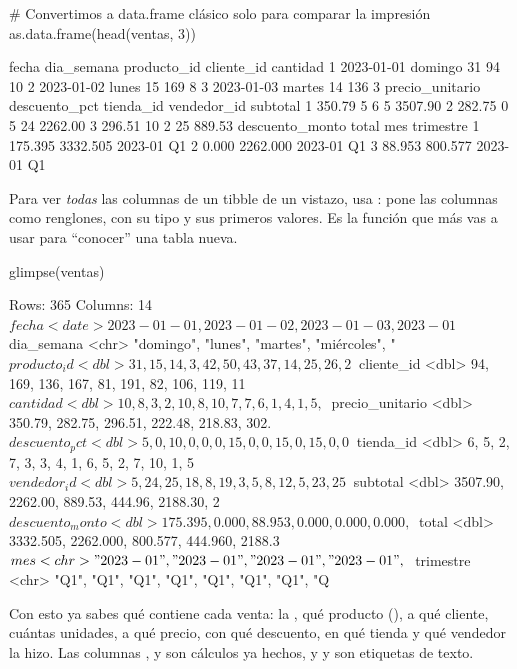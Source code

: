 \begin{rcode}
# Convertimos a data.frame clásico solo para comparar la impresión
as.data.frame(head(ventas, 3))
\end{rcode}
\begin{rsalida}
       fecha dia_semana producto_id cliente_id cantidad
1 2023-01-01    domingo          31         94       10
2 2023-01-02      lunes          15        169        8
3 2023-01-03     martes          14        136        3
  precio_unitario descuento_pct tienda_id vendedor_id subtotal
1          350.79             5         6           5  3507.90
2          282.75             0         5          24  2262.00
3          296.51            10         2          25   889.53
  descuento_monto    total     mes trimestre
1         175.395 3332.505 2023-01        Q1
2           0.000 2262.000 2023-01        Q1
3          88.953  800.577 2023-01        Q1
\end{rsalida}

Para ver \emph{todas} las columnas de un tibble de un vistazo, usa
: pone las columnas como renglones, con su tipo y sus
primeros valores. Es la función que más vas a usar para ``conocer'' una
tabla nueva.

\begin{rcode}
glimpse(ventas)
\end{rcode}
\begin{rsalida}
Rows: 365
Columns: 14
$ fecha           <date> 2023-01-01, 2023-01-02, 2023-01-03, 2023-01~
$ dia_semana      <chr> "domingo", "lunes", "martes", "miércoles", "~
$ producto_id     <dbl> 31, 15, 14, 3, 42, 50, 43, 37, 14, 25, 26, 2~
$ cliente_id      <dbl> 94, 169, 136, 167, 81, 191, 82, 106, 119, 11~
$ cantidad        <dbl> 10, 8, 3, 2, 10, 8, 10, 7, 7, 6, 1, 4, 1, 5,~
$ precio_unitario <dbl> 350.79, 282.75, 296.51, 222.48, 218.83, 302.~
$ descuento_pct   <dbl> 5, 0, 10, 0, 0, 0, 15, 0, 0, 15, 0, 15, 0, 0~
$ tienda_id       <dbl> 6, 5, 2, 7, 3, 3, 4, 1, 6, 5, 2, 7, 10, 1, 5~
$ vendedor_id     <dbl> 5, 24, 25, 18, 8, 19, 3, 5, 8, 12, 5, 23, 25~
$ subtotal        <dbl> 3507.90, 2262.00, 889.53, 444.96, 2188.30, 2~
$ descuento_monto <dbl> 175.395, 0.000, 88.953, 0.000, 0.000, 0.000,~
$ total           <dbl> 3332.505, 2262.000, 800.577, 444.960, 2188.3~
$ mes             <chr> "2023-01", "2023-01", "2023-01", "2023-01", ~
$ trimestre       <chr> "Q1", "Q1", "Q1", "Q1", "Q1", "Q1", "Q1", "Q~
\end{rsalida}

Con esto ya sabes qué contiene cada venta: la , qué producto
(), a qué cliente, cuántas unidades, a qué precio, con
qué descuento, en qué tienda y qué vendedor la hizo. Las columnas
,  y  son cálculos
ya hechos, y  y  son etiquetas de texto.

